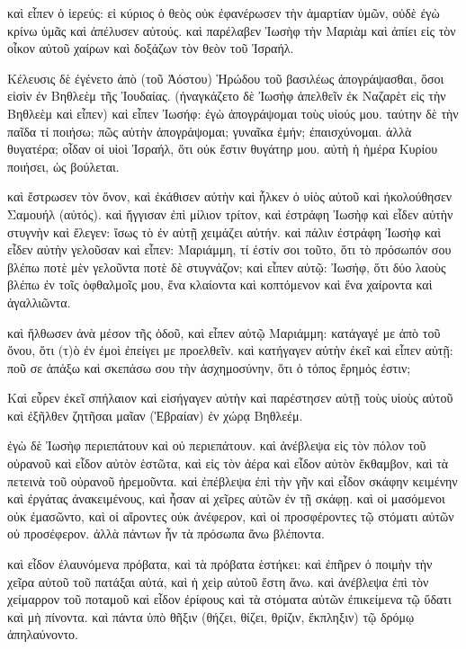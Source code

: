 \pend\pstart
καὶ εἶπεν ὁ ἱερεύς: εἰ κύριος ὁ θεὸς οὐκ ἐφανέρωσεν τὴν ἁμαρτίαν ὑμῶν, οὐδὲ ἐγὼ κρίνω ὑμᾶς καὶ ἀπέλυσεν αὐτούς. καὶ παρέλαβεν Ἰωσὴφ τὴν Μαριὰμ καὶ ἀπίει εἰς τὸν οἶκον αὐτοῦ χαίρων καὶ δοξάζων τὸν θεὸν τοῦ Ἰσραήλ.

\pend\pstart
{}

\pend\pstart
Κέλευσις δὲ ἐγένετο ἀπὸ (τοῦ Ἀόστου) Ἡρώδου τοῦ βασιλέως ἀπογράψασθαι, ὅσοι εἰσὶν ἐν Βηθλεὲμ τῆς Ἰουδαίας. (ἠναγκάζετο δὲ Ἰωσὴφ ἀπελθεῖν ἐκ Ναζαρὲτ εἰς τὴν Βηθλεὲμ καὶ εἶπεν) καὶ εἶπεν Ἰωσήφ: ἐγὼ ἀπογράψομαι τοὺς υἱούς μου. ταύτην δὲ τὴν παῖδα τί ποιήσω; πῶς αὐτὴν ἀπογράψομαι; γυναῖκα ἐμήν; ἐπαισχύνομαι. ἀλλὰ θυγατέρα; οἶδαν οἱ υἱοὶ Ἰσραήλ, ὅτι οὐκ ἔστιν θυγάτηρ μου. αὐτὴ ἡ ἡμέρα Κυρίου ποιήσει, ὡς βούλεται.

\pend\pstart
καὶ ἔστρωσεν τὸν ὄνον, καὶ ἐκάθισεν αὐτὴν καὶ ἧλκεν ὁ υἱὸς αὐτοῦ καὶ ἠκολούθησεν Σαμουήλ (αὐτός). καὶ ἤγγισαν ἐπὶ μίλιον τρίτον, καὶ ἐστράφη Ἰωσὴφ καὶ εἶδεν αὐτὴν στυγνὴν καὶ ἔλεγεν: ἴσως τὸ ἐν αὐτῇ χειμάζει αὐτήν. καὶ πάλιν ἐστράφη Ἰωσὴφ καὶ εἶδεν αὐτὴν γελοῦσαν καὶ εἶπεν: Μαριάμμη, τί ἐστίν σοι τοῦτο, ὅτι τὸ πρόσωπόν σου βλέπω ποτὲ μὲν γελοῦντα ποτὲ δὲ στυγνάζον; καὶ εἶπεν αὐτῷ: Ἰωσήφ, ὅτι δύο λαοὺς βλέπω ἐν τοῖς ὀφθαλμοῖς μου, ἔνα κλαίοντα καὶ κοπτόμενον καὶ ἔνα χαίροντα καὶ ἀγαλλιῶντα.

\pend\pstart
καὶ ἤλθωσεν ἀνὰ μέσον τῆς ὁδοῦ, καὶ εἶπεν αὐτῷ Μαριάμμη: κατάγαγέ με ἀπὸ τοῦ ὄνου, ὅτι (τ)ὸ ἐν ἐμοὶ ἐπείγει με προελθεῖν. καὶ κατήγαγεν αὐτὴν ἐκεῖ καὶ εἶπεν αὐτῇ: ποῦ σε ἀπάξω καὶ σκεπάσω σου τὴν ἀσχημοσύνην, ὅτι ὁ τόπος ἔρημός ἐστιν;

\pend\pstart
{}

\pend\pstart
Καὶ εὗρεν ἐκεῖ σπήλαιον καὶ εἰσήγαγεν αὐτὴν καὶ παρέστησεν αὐτῇ τοὺς υἱοὺς αὐτοῦ καὶ ἐξῆλθεν ζητῆσαι μαῖαν (Ἑβραίαν) ἐν χώρᾳ Βηθλεέμ.

\pend\pstart
ἐγὼ δὲ Ἰωσὴφ περιεπάτουν καὶ οὐ περιεπάτουν. καὶ ἀνέβλεψα εἰς τὸν πόλον τοῦ οὐρανοῦ καὶ εἶδον αὐτὸν ἑστῶτα, καὶ εἰς τὸν ἀέρα καὶ εἶδον αὐτὸν ἔκθαμβον, καὶ τὰ πετεινὰ τοῦ οὐρανοῦ ἠρεμοῦντα. καὶ ἐπέβλεψα ἐπὶ τὴν γῆν καὶ εἶδον σκάφην κειμένην καὶ ἐργάτας ἀνακειμένους, καὶ ἦσαν αἱ χεῖρες αὐτῶν ἐν τῇ σκάφῃ. καὶ οἱ μασόμενοι οὐκ ἐμασῶντο, καὶ οἱ αἴροντες οὐκ ἀνέφερον, καὶ οἱ προσφέροντες τῷ στόματι αὐτῶν οὐ προσέφερον. ἀλλὰ πάντων ἦν τὰ πρόσωπα ἄνω βλέποντα.

\pend\pstart
καὶ εἶδον ἐλαυνόμενα πρόβατα, καὶ τὰ πρόβατα ἑστήκει: καὶ ἐπῆρεν ὁ ποιμὴν τὴν χεῖρα αὐτοῦ τοῦ πατάξαι αὐτά, καὶ ἡ χεὶρ αὐτοῦ ἔστη ἄνω. καὶ ἀνέβλεψα ἐπὶ τὸν χείμαρρον τοῦ ποταμοῦ καὶ εἶδον ἐρίφους καὶ τὰ στόματα αὐτῶν ἐπικείμενα τῷ ὕδατι καὶ μὴ πίνοντα. καὶ πάντα ὑπὸ θῆξιν (θήζει, θίζει, θρίζιν, ἔκπληξιν) τῷ δρόμῳ ἀπηλαύνοντο.

